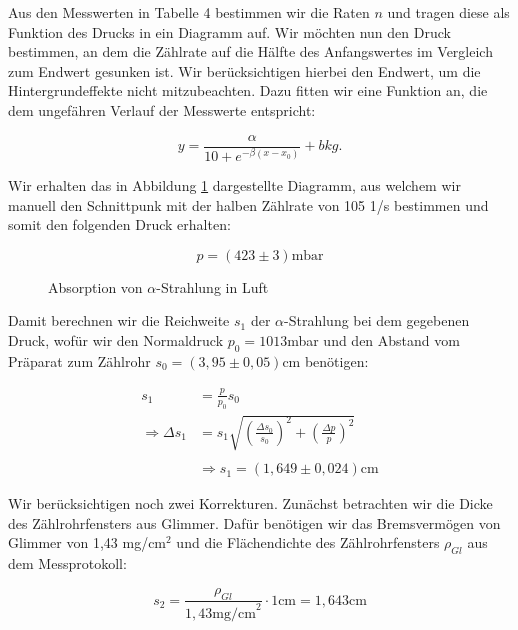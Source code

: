 \documentclass{article}
\begin{document}
Aus den Messwerten in Tabelle 4 bestimmen wir die Raten $n$ und tragen diese als Funktion des Drucks in ein Diagramm auf. Wir möchten nun den Druck bestimmen, an dem die Zählrate auf die Hälfte des Anfangswertes im Vergleich zum Endwert gesunken ist. 
Wir berücksichtigen hierbei den Endwert, um die Hintergrundeffekte nicht mitzubeachten. Dazu fitten wir eine Funktion an, die dem ungefähren Verlauf der Messwerte entspricht:

\begin{equation}
    y = \frac{\alpha}{10 + e^{-\beta (x - x_0)}} + bkg.
\end{equation}

Wir erhalten das in Abbildung \ref{fig:A6-Alpha} dargestellte Diagramm, aus welchem wir manuell den Schnittpunk mit der halben Zählrate von 105 1/s bestimmen und somit den folgenden Druck erhalten:

\begin{equation}
    p = (423 \pm 3) \text{mbar}
\end{equation}

\begin{figure}[!b]
    \centering
    \caption{Absorption von $\alpha$-Strahlung in Luft}
    \label{fig:A6-Alpha}
\end{figure}

Damit berechnen wir die Reichweite $s_1$ der $\alpha$-Strahlung bei dem gegebenen Druck, wofür wir den Normaldruck $p_0 = 1013$mbar und den Abstand vom Präparat zum Zählrohr $s_0 = (3,95 \pm 0,05)$cm benötigen:

\begin{equation}
    \begin{split}
        s_1 &= \frac{p}{p_0} s_0 \\
        \Rightarrow \Delta s_1 &= s_1 \sqrt{\left(\frac{\Delta s_0}{s_0}\right)^2 + \left(\frac{\Delta p}{p}\right)^2} \\ \\
        &\Rightarrow s_1 = (1,649 \pm 0,024) \text{cm}
    \end{split}
\end{equation}

Wir berücksichtigen noch zwei Korrekturen. Zunächst betrachten wir die Dicke des Zählrohrfensters aus Glimmer. Dafür benötigen wir das Bremsvermögen von Glimmer von 1,43 mg/cm$^2$ und die Flächendichte des Zählrohrfensters $\rho_{Gl}$ aus dem Messprotokoll:

\begin{equation}
    s_2 = \frac{\rho_{Gl}}{1,43 \text{mg/cm}^2} \cdot 1 \text{cm} = 1,643 \text{cm}
\end{equation}
\end{document}
